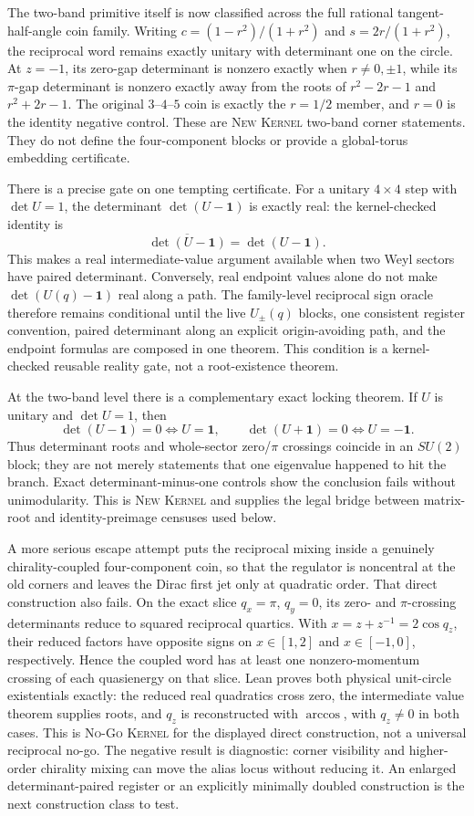 \documentclass[11pt]{article}
\newcommand{\Kernel}{\textcolor{kernelcolor}{\textsc{Kernel}}}
\newcommand{\NewResult}{\textsc{New}}
\newcommand{\NoGo}{\textsc{No-Go}}
\newcommand{\id}{\mathbf{1}}
\begin{document}
The two-band primitive itself is now classified across the full rational
tangent-half-angle coin family.  Writing
$c=(1-r^2)/(1+r^2)$ and $s=2r/(1+r^2)$, the reciprocal word remains exactly
unitary with determinant one on the circle.  At $z=-1$, its zero-gap
determinant is nonzero exactly when $r\ne0,\pm1$, while its $\pi$-gap
determinant is nonzero exactly away from the roots of
$r^2-2r-1$ and $r^2+2r-1$.  The original $3$--$4$--$5$ coin is exactly the
$r=1/2$ member, and $r=0$ is the identity negative control.  These are
\NewResult{} \Kernel{} two-band corner statements.  They do not define the
four-component blocks or provide a global-torus embedding certificate.

There is a precise gate on one tempting certificate.  For a unitary
$4\times4$ step with $\det U=1$, the determinant $\det(U-\id)$ is exactly real:
the kernel-checked identity is
\[
 \overline{\det(U-\id)}=\det(U-\id).
\]
This makes a real intermediate-value argument available when two Weyl sectors
have paired determinant.  Conversely, real endpoint values alone do not make
$\det(U(q)-\id)$ real along a path.  The family-level reciprocal sign oracle
therefore remains conditional until the live $U_\pm(q)$ blocks, one consistent
register convention, paired determinant along an explicit origin-avoiding
path, and the endpoint formulas are composed in one theorem.  This condition is
a kernel-checked reusable reality gate, not a root-existence theorem.

At the two-band level there is a complementary exact locking theorem.  If
$U$ is unitary and $\det U=1$, then
\[
 \det(U-\id)=0\Longleftrightarrow U=\id,
 \qquad
 \det(U+\id)=0\Longleftrightarrow U=-\id.
\]
Thus determinant roots and whole-sector zero/$\pi$ crossings coincide in an
$SU(2)$ block; they are not merely statements that one eigenvalue happened to
hit the branch.  Exact determinant-minus-one controls show the conclusion fails
without unimodularity.  This is \NewResult{} \Kernel{} and supplies the legal
bridge between matrix-root and identity-preimage censuses used below.

A more serious escape attempt puts the reciprocal mixing inside a genuinely
chirality-coupled four-component coin, so that the regulator is noncentral at
the old corners and leaves the Dirac first jet only at quadratic order.  That
direct construction also fails.  On the exact slice $q_x=\pi$, $q_y=0$, its
zero- and $\pi$-crossing determinants reduce to squared reciprocal quartics.
With $x=z+z^{-1}=2\cos q_z$, their reduced factors have opposite signs on
$x\in[1,2]$ and $x\in[-1,0]$, respectively.  Hence the coupled word has at
least one nonzero-momentum crossing of each quasienergy on that slice.  Lean proves
both physical unit-circle existentials exactly: the reduced real quadratics
cross zero, the intermediate value theorem supplies roots, and $q_z$ is
reconstructed with $\arccos$, with $q_z\ne0$ in both cases.  This is
\NoGo{} \Kernel{} for the displayed direct construction, not a universal
reciprocal no-go.  The negative result is diagnostic: corner visibility and
higher-order chirality mixing can move the alias locus without reducing it.
An enlarged determinant-paired register or an explicitly minimally doubled
construction is the next construction class to test.
\end{document}
